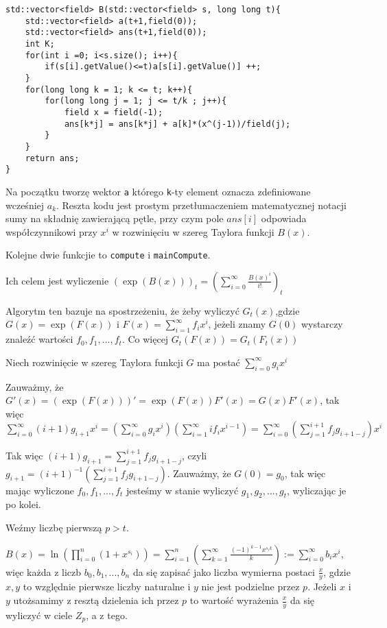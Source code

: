 \documentclass{article}
\begin{document}
\begin{lstlisting}
std::vector<field> B(std::vector<field> s, long long t){
    std::vector<field> a(t+1,field(0));
    std::vector<field> ans(t+1,field(0));
    int K;
    for(int i =0; i<s.size(); i++){
        if(s[i].getValue()<=t)a[s[i].getValue()] ++;
    }
    for(long long k = 1; k <= t; k++){
        for(long long j = 1; j <= t/k ; j++){
            field x = field(-1);
            ans[k*j] = ans[k*j] + a[k]*(x^(j-1))/field(j);
        }
    }
    return ans;
}
\end{lstlisting}

Na początku tworzę wektor \texttt{a} którego \texttt{k}-ty element oznacza zdefiniowane wcześniej $a_k$. 
Reszta kodu jest prostym przetłumaczeniem matematycznej notacji sumy na składnię zawierającą pętle, przy 
czym pole $ans[i]$ odpowiada współczynnikowi przy $x^i$ w rozwinięciu w szereg Taylora funkcji $B(x)$.

Kolejne dwie funkcjie to \texttt{compute} i \texttt{mainCompute}. 



Ich celem jest wyliczenie $(\exp(B(x)))_t=(\sum_{i=0}^\infty \frac{B(x)^i}{i!})_t$

Algorytm ten bazuje na spostrzeżeniu, że żeby wyliczyć $G_t(x)$,gdzie $G(x)=\exp(F(x))$ i $F(x) =\sum_{i=1}^\infty f_ix^i$,
jeżeli znamy $G(0)$ wystarczy znaleźć wartości $f_0,f_1,...,f_t$. Co więcej $G_t(F(x))=G_t(F_t(x))$

Niech rozwinięcie w szereg Taylora funkcji $G$ ma postać $\sum^{\infty}_{i=0}g_ix^i$

Zauważmy, że $G'(x)=(\exp(F(x)))'=\exp(F(x))F'(x)=G(x)F'(x)$, tak więc
$\sum_{i=0}^{\infty}(i+1)g_{i+1}x^{i}=(\sum_{i=0}^{\infty}g_ix^i)(\sum_{i=1}^{\infty}if_{i}x^{i-1})=
\sum_{i=0}^{\infty}(\sum_{j=1}^{i+1}f_jg_{i+1-j})x^i$

Tak więc $(i+1)g_{i+1}=\sum_{j=1}^{i+1}f_jg_{i+1-j}$, czyli $g_{i+1}=(i+1)^{-1}(\sum_{j=1}^{i+1}f_jg_{i+1-j})$.
Zauważmy, że $G(0)=g_0$, tak więc mając wyliczone $f_0,f_1,...,f_t$ jesteśmy w stanie wyliczyć $g_1,g_2,...,g_t$, wyliczając je po kolei.

Weźmy liczbę pierwszą $p>t$.

$B(x)=\ln(\prod_{i=0}^n(1+x^{s_i}))=\sum_{i=1}^{n}(\sum_{k=1}^{\infty}\frac{(-1)^{k-1}x^{s_ik}}{k}):=\sum_{i=0}^{\infty}b_ix^i$, więc każda z liczb $b_0,b_1,...,b_n$ da się zapisać jako liczba wymierna postaci $\frac{x}{y}$, gdzie $x,y$ to
względnie pierwsze liczby naturalne i $y$ nie jest podzielne przez $p$. Jeżeli $x$ i $y$ utożsamimy z resztą dzielenia ich 
przez $p$ to wartość wyrażenia $\frac{x}{y}$ da się wyliczyć w ciele $Z_p$, a z tego.
\end{document}
